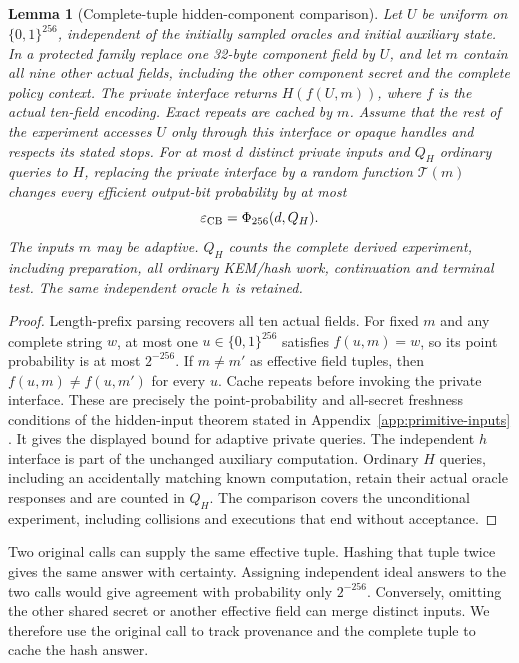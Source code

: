 \documentclass[pdflatex]{sn-jnl}
\theoremstyle{thmstyleone}
\newtheorem{lemma}[theorem]{Lemma}
\theoremstyle{thmstylethree}
\theoremstyle{thmstyletwo}
\begin{document}
\begin{lemma}[Complete-tuple hidden-component comparison]
\label{lem:cb-hidden-component}
Let $U$ be uniform on $\{0,1\}^{256}$, independent of the initially sampled
oracles and initial auxiliary state. In a protected family replace one
32-byte component field by $U$, and let $m$ contain all nine other actual
fields, including the other component secret and the complete policy
context. The private interface returns
$H(f(U,m))$, where $f$ is the actual ten-field encoding. Exact repeats are
cached by $m$. Assume that the rest of the experiment accesses $U$ only
through this interface or opaque handles and respects its stated stops.
For at most $d$ distinct private inputs and $Q_H$ ordinary queries to $H$,
replacing the private interface by a random function $\mathcal T(m)$
changes every efficient output-bit probability by at most
\begin{equation}
 \varepsilon_{\rm CB}=\Phi_{256}(d,Q_H).
 \label{eq:cb-hidden-cost}
\end{equation}
The inputs $m$ may be adaptive. $Q_H$ counts the complete derived
experiment, including preparation, all ordinary KEM/hash work, continuation
and terminal test. The same independent oracle $h$ is retained.
\end{lemma}
\begin{proof}
Length-prefix parsing recovers all ten actual fields. For fixed $m$ and any
complete string $w$, at most one $u\in\{0,1\}^{256}$ satisfies
$f(u,m)=w$, so its point probability is at most $2^{-256}$. If $m\ne m'$
as effective field tuples, then $f(u,m)\ne f(u,m')$ for every $u$.
Cache repeats before invoking the private interface. These are precisely
the point-probability and all-secret freshness conditions of the
hidden-input theorem stated in Appendix~\ref{app:primitive-inputs}
\cite[Theorem~2]{dfh2022}. It gives the displayed bound for adaptive
private queries. The independent $h$ interface is part of the unchanged
auxiliary computation. Ordinary $H$ queries, including an accidentally
matching known computation, retain their actual oracle responses and are
counted in $Q_H$. The comparison covers the unconditional experiment,
including collisions and executions that end without acceptance.
\end{proof}

Two original calls can supply the same effective tuple. Hashing that
tuple twice gives the same answer with certainty. Assigning independent
ideal answers to the two calls would give agreement with probability
only $2^{-256}$. Conversely, omitting the other shared secret or another
effective field can merge distinct inputs. We therefore use the original
call to track provenance and the complete tuple to cache the hash
answer.
\end{document}

